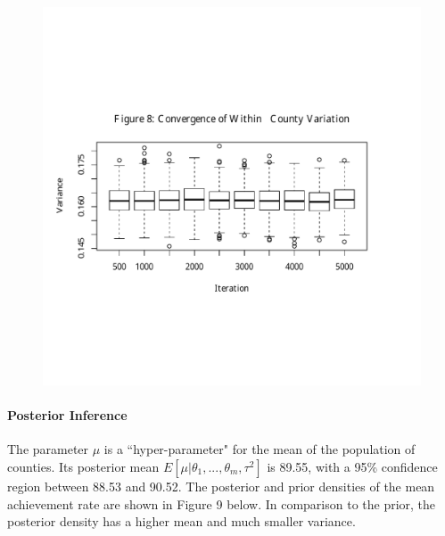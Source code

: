 \documentclass[11pt]{article}
\begin{document}
\begin{figure}[H]
\centering
    \includegraphics[trim= 0in 1.5in 0in 2in,clip,scale=0.8]{sigma}
\end{figure}

\paragraph{Posterior Inference}  The parameter $\mu$ is a ``hyper-parameter" for the mean of the population of counties.  Its posterior mean $E[\mu\vert\theta_1,...,\theta_m,\tau^2]$ is 89.55, with a 95\% confidence region between 88.53 and 90.52.  The posterior and prior densities of the mean achievement rate are shown in Figure 9 below.  In comparison to the prior, the posterior density has a higher mean and much smaller variance.  
\end{document}
